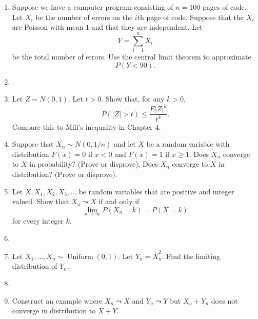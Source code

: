 \documentclass{article}
\begin{document}
\begin{enumerate}
\begin{enumerate}
		\end{enumerate}
	\item Suppose we have a computer program consisting of $n = 100$ pages of code. Let $X_i$ be the number of errors on the $i$th page of code. Suppose that the $X_i$ are Poisson with mean $1$ and that they are independent. Let
	$$
	Y = \sum_{i = 1}^n X_i
	$$
	be the total number of errors. Use the central limit theorem to approximate
	$$
	P(Y < 90).
	$$
	\item
	\item Let $Z \sim N(0, 1)$. Let $t > 0$. Show that, for any $k > 0$,
	$$
	P(|Z| > t) \leq \frac{E|Z|^k}{t^k}.
	$$
	Compare this to Mill's inequality in Chapter 4.
	\item Suppose that $X_n \sim N(0, 1/n)$ and let $X$ be a random variable with distribution $F(x) = 0$ if $x < 0$ and $F(x) = 1$ if $x \geq 1$. Does $X_n$ converge to $X$ in probability? (Prove or disprove). Does $X_n$ converge to $X$ in distribution? (Prove or disprove).
	\item Let $X, X_1, X_2, X_3, \dots$ be random variables that are positive and integer valued. Show that $X_n \leadsto X$ if and only if
	$$
	\lim_{n \rightarrow \infty} P(X_n = k) = P(X = k)
	$$
	for every integer $k$.
	\item
	\item Let $X_1, \dots, X_n \sim \operatorname{Uniform}(0, 1)$. Let $Y_n = \overline{X}_n^2$. Find the limiting distribution of $Y_n$.
	\item
	\item Construct an example where $X_n \leadsto X$ and $Y_n \leadsto Y$ but $X_n + Y_n$ does not converge in distribution to $X + Y$.
\end{enumerate}
\end{document}
